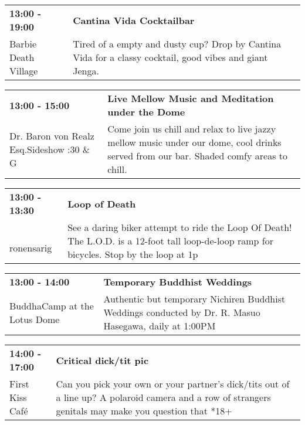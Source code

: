 \begin{tabular}{ p{1in} p{2.2in} }
    \textbf{13:00 - 19:00} & \textbf{Cantina Vida Cocktailbar} \\
    Barbie Death Village \newline  & Tired of a empty and dusty cup? Drop by Cantina Vida for a classy cocktail, good vibes and giant Jenga. \\
    \hline 
\end{tabular}
    
\begin{tabular}{ p{1in} p{2.2in} }
    \textbf{13:00 - 15:00} & \textbf{Live Mellow Music and Meditation under the Dome} \\
    Dr. Baron von Realz Esq.Sideshow \newline 4:30 \& G & Come join us chill and relax to live jazzy mellow music under our dome, cool drinks served from our bar. Shaded comfy areas to chill. \\
    \hline 
\end{tabular}
    
\begin{tabular}{ p{1in} p{2.2in} }
    \textbf{13:00 - 13:30} & \textbf{Loop of Death} \\
    ~ \newline ronensarig & See a daring biker attempt to ride the Loop Of Death! The L.O.D. is a 12-foot tall loop-de-loop ramp for bicycles. Stop by the loop at 1p \\
    \hline 
\end{tabular}
    
\begin{tabular}{ p{1in} p{2.2in} }
    \textbf{13:00 - 14:00} & \textbf{Temporary Buddhist Weddings} \\
    BuddhaCamp at the Lotus Dome \newline  & Authentic but temporary Nichiren Buddhist Weddings conducted by Dr. R. Masuo Hasegawa, daily at 1:00PM \\
    \hline 
\end{tabular}
    
\begin{tabular}{ p{1in} p{2.2in} }
    \textbf{14:00 - 17:00} & \textbf{Critical dick/tit pic} \\
    First Kiss Caf\'e \newline  & Can you pick your own or your partner's dick/tits out of a line up?  A polaroid camera and a row of strangers genitals may make you question that *18+ \\
    \hline 
\end{tabular}
    
